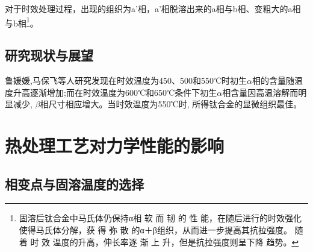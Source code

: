 \documentclass[
class = book,
zihao = -4,
font = noto,
paper = a4paper,
openany
]{easybook}
\begin{document}
对于时效处理过程，出现的组织为a'相，a'相脱溶出来的a相与b相、变粗大的a相与b相\footnote{固溶后钛合金中马氏体仍保持α相 软 而 韧 的 性 能，在随后进行的时效强化使得马氏体分解，获 得 弥 散 的α＋β组织，从而进一步提高其抗拉强度。 随 着 时 效 温度的升高，伸长率逐 渐 上 升，但是抗拉强度则呈下降 趋势。}。\cite{zhanghaoyinGurongShixiaoduiTC4taihejinzuzhihelixuexingnengdeyingxiang2014}

\section{研究现状与展望}
 鲁媛媛,马保飞等人研究发现在时效温度为450、500和550℃时初生$\alpha $相的含量随温度升高逐渐增加;而在时效温度为600℃和650℃条件下初生$\alpha $相含量因高温溶解而明显减少, $\beta $相尺寸相应增大。当时效温度为550℃时, 所得钛合金的显微组织最佳\cite{timing}。
\chapter{热处理工艺对力学性能的影响}
\section{相变点与固溶温度的选择}
\end{document}
